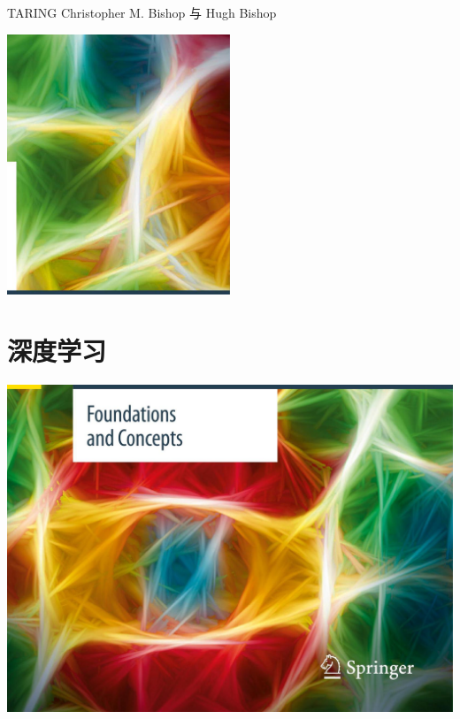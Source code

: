 \documentclass[10pt]{article}
\begin{document}
TARING Christopher M. Bishop 与 Hugh Bishop




\begin{center}
\includegraphics[max width=0.5\textwidth]{images/0194e279-9b28-703a-88f4-c3ac21e2010d_0_968_0_675_789_0.jpg}
\end{center}
\hspace*{3em} 

\section*{深度学习}

\begin{center}
\includegraphics[max width=1.0\textwidth]{images/0194e279-9b28-703a-88f4-c3ac21e2010d_0_0_1124_1643_1207_0.jpg}
\end{center}
\hspace*{3em} 
\end{document}
